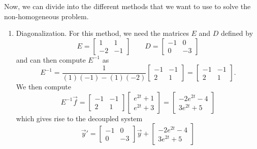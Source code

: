 \documentclass{ximera}
\begin{document}
\begin{exampleSol}
    Now, we can divide into the different methods that we want to use to solve the non-homogeneous problem. 
    \begin{enumerate}
        \item Diagonalization. For this method, we need the matrices $E$ and $D$ defined by
            \begin{equation*}
                E = \begin{bmatrix} 1 & 1 \\ -2 & -1 \end{bmatrix} \qquad D = \begin{bmatrix} -1 & 0 \\ 0 & -3 \end{bmatrix} 
            \end{equation*}
            and can then compute $E^{-1}$ as 
            \begin{equation*}
                E^{-1} = \frac{1}{(1)(-1) - (1)(-2)} \begin{bmatrix} -1 & -1 \\ 2 & 1 \end{bmatrix} = \begin{bmatrix} -1 & -1 \\ 2 & 1 \end{bmatrix}.
            \end{equation*}
            We then compute 
            \begin{equation*}
                E^{-1}\vec{f} =  \begin{bmatrix} -1 & -1 \\ 2 & 1 \end{bmatrix} \begin{bmatrix} e^{2t} + 1 \\ e^{2t} + 3 \end{bmatrix} = \begin{bmatrix} -2e^{2t} - 4 \\ 3e^{2t} + 5 \end{bmatrix}
            \end{equation*}
            which gives rise to the decoupled system 
            \begin{equation*}
                \vec{y}' = \begin{bmatrix} -1 & 0 \\ 0 & -3 \end{bmatrix} \vec{y} + \begin{bmatrix} -2e^{2t} - 4 \\ 3e^{2t} + 5 \end{bmatrix}

\end{equation*}
\end{enumerate}
\end{exampleSol}
\end{document}
